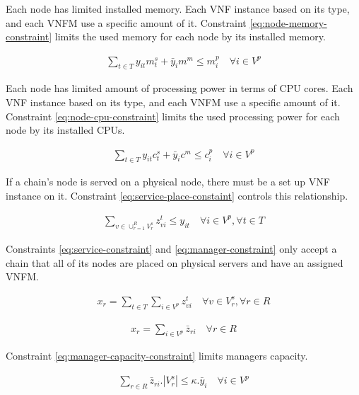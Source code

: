 Each node has limited installed memory. Each VNF instance based on its type, and each VNFM use a specific amount of it.
Constraint \ref{eq:node-memory-constraint} limits the used memory for each node by its installed memory.

\begin{align}\label{eq:node-memory-constraint}
    \sum_{t \in T} y_{it} m^s_t + \bar{y}_i m^m \le m^p_i
    \quad
    \forall i \in V^p
\end{align}

Each node has limited amount of processing power in terms of CPU cores.
Each VNF instance based on its type, and each VNFM use a specific amount of it.
Constraint \ref{eq:node-cpu-constraint} limits the used processing power for each node by its installed CPUs.

\begin{align}\label{eq:node-cpu-constraint}
    \sum_{t \in T} y_{it} c^s_t + \bar{y}_i c^m \le c^p_i
    \quad
    \forall i \in V^p
\end{align}

If a chain's node is served on a physical node, there must be a set up VNF instance on it.
Constraint \ref{eq:service-place-constaint} controls this relationship.

\begin{align}\label{eq:service-place-constaint}
    \sum_{v \in \cup_{r=1}^R V^s_r} z_{vi}^t \le y_{it}
    \quad
    \forall i \in V^p, \forall t \in T
\end{align}

Constraints \ref{eq:service-constraint} and \ref{eq:manager-constraint} only accept a chain that all of its nodes are placed on physical servers and have an assigned VNFM.

\begin{align}\label{eq:service-constraint}
    x_r = \sum_{t \in T} \sum_{i \in V^p} z_{vi}^{t}
    \quad
    \forall v \in V^s_r, \forall r \in R
\end{align}

\begin{align}\label{eq:manager-constraint}
    x_r = \sum_{i \in V^p} \bar{z}_{ri}
    \quad
    \forall r \in R
\end{align}

Constraint \ref{eq:manager-capacity-constraint} limits managers capacity.

\begin{align}\label{eq:manager-capacity-constraint}
    \sum_{r \in R} \bar{z}_{ri} . |V^s_r| \le \kappa . \bar{y}_{i}
    \quad
    \forall i \in V^p
\end{align}

